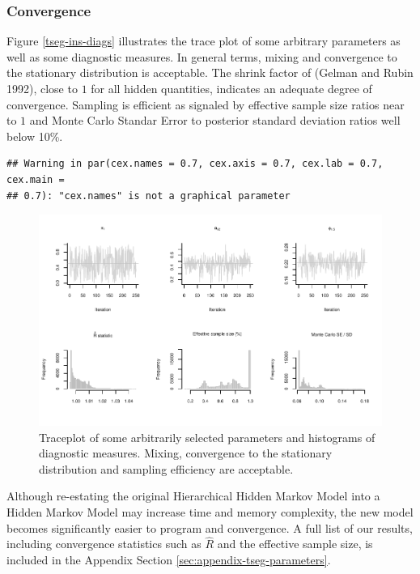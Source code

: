 \documentclass[]{article}
\begin{document}
\subsubsection{Convergence}\label{convergence}

Figure \ref{tseg-ins-diags} illustrates the trace plot of some arbitrary
parameters as well as some diagnostic measures. In general terms, mixing
and convergence to the stationary distribution is acceptable. The shrink
factor of (Gelman and Rubin 1992), close to \(1\) for all hidden
quantities, indicates an adequate degree of convergence. Sampling is
efficient as signaled by effective sample size ratios near to \(1\) and
Monte Carlo Standar Error to posterior standard deviation ratios well
below 10\%.

\begin{verbatim}
## Warning in par(cex.names = 0.7, cex.axis = 0.7, cex.lab = 0.7, cex.main =
## 0.7): "cex.names" is not a graphical parameter
\end{verbatim}

\begin{figure}[H]
\includegraphics[width=\textwidth]{main_files/figure-latex/unnamed-chunk-12-1} \caption{Traceplot of some arbitrarily selected parameters and histograms of diagnostic measures. Mixing, convergence to the stationary distribution and sampling efficiency are acceptable.\label{tseg-ins-diags}}\label{fig:unnamed-chunk-12}
\end{figure}

Although re-estating the original Hierarchical Hidden Markov Model into
a Hidden Markov Model may increase time and memory complexity, the new
model becomes significantly easier to program and convergence. A full
list of our results, including convergence statistics such as
\(\hat{R}\) and the effective sample size, is included in the Appendix
Section \ref{sec:appendix-tseg-parameters}.
\end{document}
